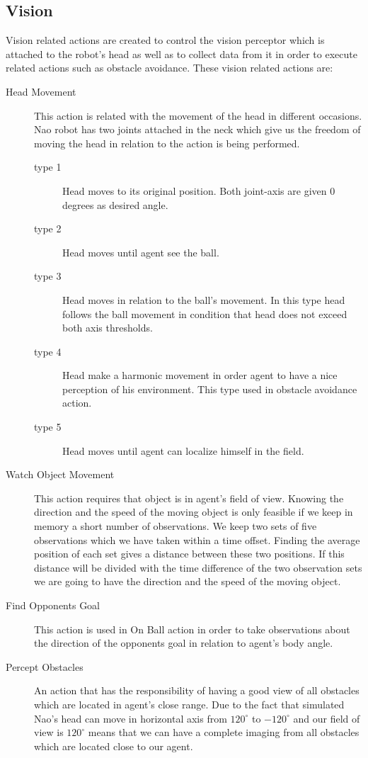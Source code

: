 \subsection{Vision}
Vision related actions are created to control the vision perceptor which is attached to the robot's head as well as to collect data from it in order to execute related actions such as obstacle avoidance. These vision related actions are:
\begin{description}
 \item[Head Movement] This action is related with the movement of the head in different occasions. Nao robot has two joints attached in the neck which give us the freedom of moving the head in relation to the action is being performed.
 \begin{description}
 \item[type 1] Head moves to its original position. Both joint-axis are given 0 degrees as desired angle.
 \item[type 2] Head moves until agent see the ball.
 \item[type 3] Head moves in relation to the ball's movement. In this type head follows the ball movement in condition that head does not exceed both axis thresholds.
 \item[type 4] Head make a harmonic movement in order agent to have a nice perception of his environment. This type used in obstacle avoidance action.
 \item[type 5] Head moves until agent can localize himself in the field.
 \end{description}
 \item[Watch Object Movement] This action requires that object is in agent's field of view. Knowing the direction and the speed of the moving object is only feasible if we keep in memory a short number of observations. We keep two sets of five observations which we have taken within a time offset. Finding the average position of each set gives a distance between these two positions. If this distance will be divided with the time difference of the two observation sets we are going to have the direction and the speed of the moving object.
 \item[Find Opponents Goal] This action is used in On Ball action in order to take observations about the direction of the opponents goal in relation to agent's body angle.
 \item[Percept Obstacles]
 An action that has the responsibility of having a good view of all obstacles which are located in agent's close range. Due to the fact that simulated Nao's head can move in horizontal axis from $120^{\circ}$ to $-120^{\circ}$ and our field of view is $120^{\circ}$ means that we can have a complete imaging from all obstacles which are located close to our agent.

\end{description}
